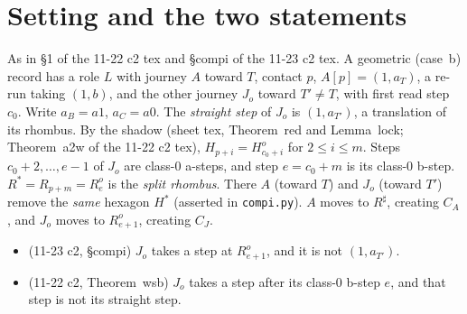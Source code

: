 \documentclass[11pt]{article}
\theoremstyle{definition}\newtheorem{definition}[theorem]{Definition}\newtheorem{remark}[theorem]{Remark}
\begin{document}
\section{Setting and the two statements}
As in \S1 of the 11-22 c2 tex and \S compi of the 11-23 c2 tex. A geometric (case~b) record has a role $L$ with journey $A$ toward $T$, contact $p$, $A[p]=(1,a_T)$, a re-run taking $(1,b)$, and the other journey $J_o$ toward $T'\neq T$, with first read step $c_0$. Write $a_B=a1$, $a_C=a0$. The \emph{straight step} of $J_o$ is $(1,a_{T'})$, a translation of its rhombus. By the shadow (sheet tex, Theorem~red and Lemma~lock; Theorem~a2w of the 11-22 c2 tex), $H_{p+i}=H^o_{c_0+i}$ for $2\le i\le m$. Steps $c_0+2,\dots,e-1$ of $J_o$ are class-0 a-steps, and step $e=c_0+m$ is its class-0 b-step. $R^\ast=R_{p+m}=R^o_e$ is the \emph{split rhombus}. There $A$ (toward $T$) and $J_o$ (toward $T'$) remove the \emph{same} hexagon $H^\ast$ (asserted in \texttt{compi.py}). $A$ moves to $R^\sharp$, creating $C_A$, and $J_o$ moves to $R^o_{e+1}$, creating $C_J$.
\begin{itemize}
\item[\textbf{(E1)}] (11-23 c2, \S compi) $J_o$ takes a step at $R^o_{e+1}$, and it is not $(1,a_{T'})$.
\item[\textbf{(Tn)}] (11-22 c2, Theorem~wsb) $J_o$ takes a step after its class-0 b-step $e$, and that step is not its straight step.
\end{itemize}
\end{document}
